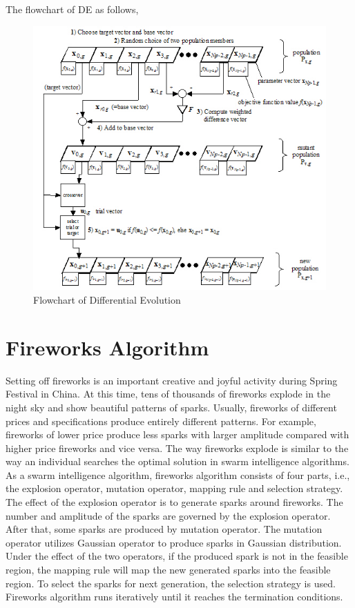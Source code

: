 \documentclass[11pt, a4paper]{report}
\begin{document}
\newpage 
The flowchart of DE as follows,
\vspace{30px}
	\begin{figure}[!bth]
	\center
	\includegraphics[scale=1.2]{images/de2.jpg}
	\caption[Flowchart of Differential Evolution]{Flowchart of Differential Evolution \cite{diag:de}}
	\label{fig:deFlowchart}
	\end{figure}

\newpage

\section{Fireworks Algorithm}
Setting off fireworks is an important creative and joyful activity during Spring Festival in China. At this time, tens of thousands of fireworks explode in the night sky and show beautiful patterns of sparks. Usually, fireworks of different prices and specifications produce entirely different patterns. For example, fireworks of lower price produce less sparks with larger amplitude compared with higher price fireworks and vice versa. The way fireworks explode is similar to the way an individual searches the optimal solution in swarm intelligence algorithms. As a swarm intelligence algorithm, fireworks algorithm consists of four parts, i.e., the explosion operator, mutation operator, mapping rule and selection strategy. The effect of the explosion operator is to generate sparks around fireworks. The number and amplitude of the sparks are governed by the explosion operator. After that, some sparks are produced by mutation operator. The mutation operator utilizes Gaussian operator to produce sparks in Gaussian distribution. Under the effect of the two operators, if the produced spark is not in the feasible region, the mapping rule will map the new generated sparks into the feasible region. To select the sparks for next generation, the selection strategy is used. Fireworks algorithm runs iteratively until it reaches the termination conditions.
\end{document}
